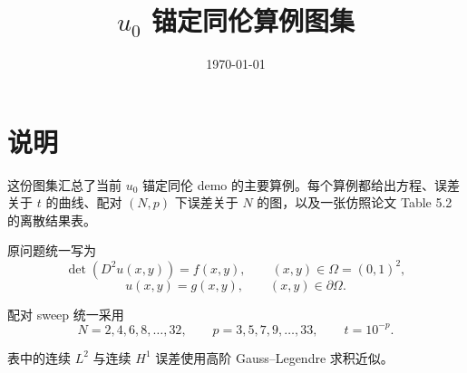 ﻿\documentclass[11pt,a4paper]{ctexart}
\title{$u_0$ 锚定同伦算例图集}
\author{}
\date{\today}
\begin{document}
\maketitle
\tableofcontents

\section*{说明}
这份图集汇总了当前 $u_0$ 锚定同伦 demo 的主要算例。每个算例都给出方程、误差关于 $t$ 的曲线、配对 $(N,p)$ 下误差关于 $N$ 的图，以及一张仿照论文 Table 5.2 的离散结果表。

原问题统一写为
\[
\det(D^2 u(x,y)) = f(x,y), \qquad (x,y)\in \Omega=(0,1)^2,
\]
\[
u(x,y)=g(x,y), \qquad (x,y)\in \partial\Omega.
\]

配对 sweep 统一采用
\[
N = 2,4,6,8,\ldots,32, \qquad
p = 3,5,7,9,\ldots,33, \qquad
t = 10^{-p}.
\]

表中的连续 $L^2$ 与连续 $H^1$ 误差使用高阶 Gauss--Legendre 求积近似。

\clearpage
\end{document}
